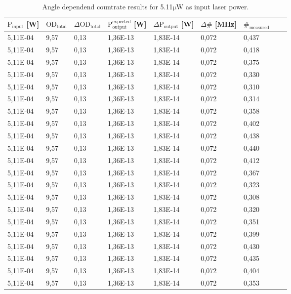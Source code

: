 \begin{table}[!hbt]
    \centering
    \begin{tabular}{|l|l|l|l|l|l|l|l|l|}
    \hline
        $\text{P}_{\text{input}}$ [W] & $\text{OD}_{\text{total}}$ & $\Delta \text{OD}_{\text{total}}$  & $\text{P}^{\text{expected}}_{\text{output}}$ [W] & $\Delta \text{P}_{\text{output}}$ [W] & $\Delta \# $ [MHz] & $\#_{\text{measured}} $ \\ \hline
        5,11E-04 & 9,57 & 0,13 & 1,36E-13 &1,83E-14 & 0,072 & 0,437 \\ \hline
        5,11E-04 & 9,57 & 0,13 & 1,36E-13 &1,83E-14 & 0,072 & 0,418 \\ \hline
        5,11E-04 & 9,57 & 0,13 & 1,36E-13 &1,83E-14 & 0,072 & 0,375 \\ \hline
        5,11E-04 & 9,57 & 0,13 & 1,36E-13 &1,83E-14 & 0,072 & 0,330 \\ \hline
        5,11E-04 & 9,57 & 0,13 & 1,36E-13 &1,83E-14 & 0,072 & 0,310 \\ \hline
        5,11E-04 & 9,57 & 0,13 & 1,36E-13 &1,83E-14 & 0,072 & 0,314 \\ \hline
        5,11E-04 & 9,57 & 0,13 & 1,36E-13 &1,83E-14 & 0,072 & 0,358 \\ \hline
        5,11E-04 & 9,57 & 0,13 & 1,36E-13 &1,83E-14 & 0,072 & 0,402 \\ \hline
        5,11E-04 & 9,57 & 0,13 & 1,36E-13 &1,83E-14 & 0,072 & 0,438 \\ \hline
        5,11E-04 & 9,57 & 0,13 & 1,36E-13 &1,83E-14 & 0,072 & 0,440 \\ \hline
        5,11E-04 & 9,57 & 0,13 & 1,36E-13 &1,83E-14 & 0,072 & 0,412 \\ \hline
        5,11E-04 & 9,57 & 0,13 & 1,36E-13 &1,83E-14 & 0,072 & 0,367 \\ \hline
        5,11E-04 & 9,57 & 0,13 & 1,36E-13 &1,83E-14 & 0,072 & 0,323 \\ \hline
        5,11E-04 & 9,57 & 0,13 & 1,36E-13 &1,83E-14 & 0,072 & 0,308 \\ \hline
        5,11E-04 & 9,57 & 0,13 & 1,36E-13 &1,83E-14 & 0,072 & 0,320 \\ \hline
        5,11E-04 & 9,57 & 0,13 & 1,36E-13 &1,83E-14 & 0,072 & 0,351 \\ \hline
        5,11E-04 & 9,57 & 0,13 & 1,36E-13 &1,83E-14 & 0,072 & 0,399 \\ \hline
        5,11E-04 & 9,57 & 0,13 & 1,36E-13 &1,83E-14 & 0,072 & 0,430 \\ \hline
        5,11E-04 & 9,57 & 0,13 & 1,36E-13 &1,83E-14 & 0,072 & 0,435 \\ \hline
        5,11E-04 & 9,57 & 0,13 & 1,36E-13 &1,83E-14 & 0,072 & 0,404 \\ \hline
        5,11E-04 & 9,57 & 0,13 & 1,36E-13 &1,83E-14 & 0,072 & 0,353 \\ \hline
    \end{tabular}
    \caption{Angle dependend countrate results for 5.11$\si{\micro \W}$ as input laser power.}
    \label{tab:angle_dependend_countrate_results}
\end{table}
